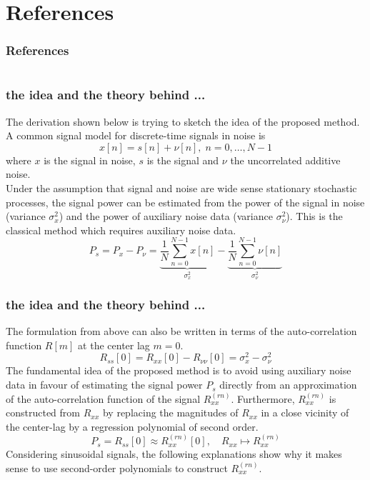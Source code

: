 \documentclass[11pt,aspectratio=169]{beamer}
\begin{document}
	\section*{References}
	\begin{frame}[noframenumbering]
		\frametitle{References}
		\printbibliography
	\end{frame}
	\appendix
	\section{\appendixname}
	\begin{frame}
		\frametitle{\appendixname{} \textendash{} the idea and the theory behind ...}\label{app:derivation}
		The derivation shown below is trying to sketch the idea of the proposed method.\\
		\vspace*{.5em}
		A common signal model for discrete-time signals in noise is
		\begin{equation}
			x[n] = s[n] + \nu[n], \; n = 0,\ldots,N-1
		\end{equation}
		where $x$ is the signal in noise, $s$ is the signal and $\nu$ the uncorrelated additive noise.\\
		Under the assumption that signal and noise are wide sense stationary stochastic processes, the signal power can be estimated from the power of the signal in noise (variance $\sigma^2_x$) and the power of auxiliary noise data (variance $\sigma^2_{\nu}$). This is the classical method which requires auxiliary noise data.
		\begin{equation}
			P_s = P_x - P_{\nu} = \underbrace{\frac{1}{N} \sum_{n=0}^{N-1} x[n]}_{\sigma^2_x} - \underbrace{\frac{1}{N} \sum_{n=0}^{N-1} \nu[n]}_{\sigma^2_{\nu}}
		\end{equation}
	\end{frame}
	\begin{frame}
		\frametitle{\appendixname{} \textendash{} the idea and the theory behind ...}
		The formulation from above can also be written in terms of the auto-correlation function $R[m]$ at the center lag $m=0$.
		\begin{equation}
			R_{ss}[0] = R_{xx}[0] - R_{\nu\nu}[0] = \sigma^2_x - \sigma^2_{\nu}
		\end{equation}
		The fundamental idea of the proposed method is to avoid using auxiliary noise data in favour of estimating the signal power $P_s$ directly from an approximation of the auto-correlation function of the signal $R^{(rn)}_{xx}$. Furthermore, $R^{(rn)}_{xx}$ is constructed from $R_{xx}$ by replacing the magnitudes of $R_{xx}$ in a close vicinity of the center-lag by a regression polynomial of second order.
		\begin{equation}
			P_s = R_{ss}[0] \approx R^{(rn)}_{xx}[0], \quad R_{xx} \mapsto R^{(rn)}_{xx}
		\end{equation}
		Considering sinusoidal signals, the following explanations show why it makes sense to use second-order polynomials to construct $R^{(rn)}_{xx}$.
	\end{frame}
\end{document}
